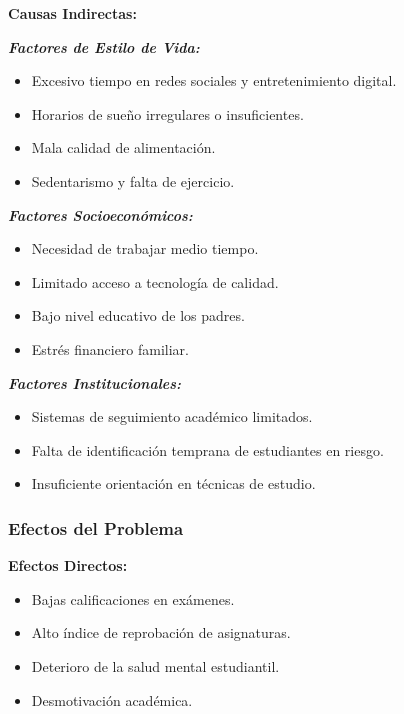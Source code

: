 \documentclass[12pt,letterpaper]{report}
\begin{document}
\textbf{Causas Indirectas:}

\textbf{\textit{Factores de Estilo de Vida:}}
\vspace{0.1cm}
\begin{itemize}
    \item Excesivo tiempo en redes sociales y entretenimiento digital.
    \item Horarios de sueño irregulares o insuficientes.
    \item Mala calidad de alimentación.
    \item Sedentarismo y falta de ejercicio.
\end{itemize}

\textbf{\textit{Factores Socioeconómicos:}}
\vspace{0.1cm}
\begin{itemize}
    \item Necesidad de trabajar medio tiempo.
    \item Limitado acceso a tecnología de calidad.
    \item Bajo nivel educativo de los padres.
    \item Estrés financiero familiar.
\end{itemize}

\textbf{\textit{Factores Institucionales:}}
\vspace{0.1cm}
\begin{itemize}
    \item Sistemas de seguimiento académico limitados.
    \item Falta de identificación temprana de estudiantes en riesgo.
    \item Insuficiente orientación en técnicas de estudio.
\end{itemize}

\subsubsection{Efectos del Problema}

\textbf{Efectos Directos:}
\vspace{0.1cm}
\begin{itemize}
    \item Bajas calificaciones en exámenes.
    \item Alto índice de reprobación de asignaturas.
    \item Deterioro de la salud mental estudiantil.
    \item Desmotivación académica.
\end{itemize}
\end{document}
